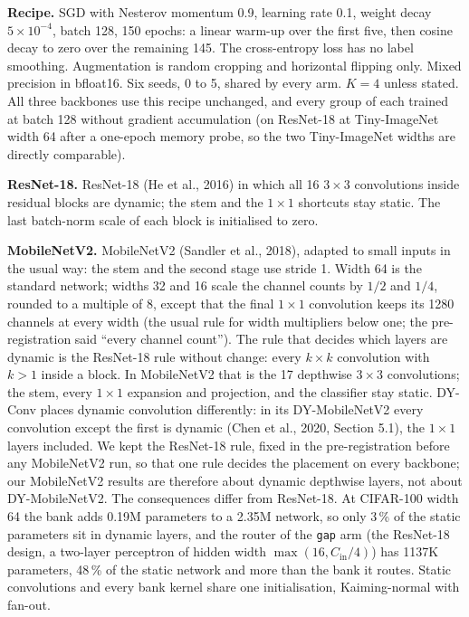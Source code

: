 \documentclass{article}
\begin{document}
\textbf{Recipe.}  SGD with Nesterov momentum 0.9, learning rate 0.1,
weight decay $5\times10^{-4}$, batch 128, 150 epochs: a linear warm-up over
the first five, then cosine decay to zero over the remaining 145. The
cross-entropy loss has no label smoothing. Augmentation is random cropping and horizontal
flipping only. Mixed precision in bfloat16. Six seeds, 0 to 5, shared by
every arm. $K=4$ unless stated. All three backbones use this recipe
unchanged, and every group of each trained at batch 128 without gradient
accumulation (on ResNet-18 at Tiny-ImageNet width 64 after a one-epoch
memory probe, so the two Tiny-ImageNet widths are directly comparable).

\textbf{ResNet-18.}  ResNet-18 (He et al., 2016) in which all 16
$3\times3$ convolutions inside residual blocks are dynamic; the stem and
the $1\times1$ shortcuts stay static. The last batch-norm scale of each
block is initialised to zero.

\textbf{MobileNetV2.}  MobileNetV2 (Sandler et al., 2018),
adapted to small inputs in the usual way: the stem and the second stage
use stride 1. Width 64 is the standard network; widths 32 and 16 scale the
channel counts by $1/2$ and $1/4$, rounded to a multiple of 8, except that
the final $1\times1$ convolution keeps its 1280 channels at every width (the
usual rule for width multipliers below one; the pre-registration said
``every channel count''). The
rule that decides which layers are dynamic is the ResNet-18 rule without
change: every $k\times k$ convolution with $k>1$ inside a block. In
MobileNetV2 that is the 17 depthwise $3\times3$ convolutions; the stem,
every $1\times1$ expansion and projection, and the classifier stay
static. DY-Conv places dynamic convolution differently: in its
DY-MobileNetV2 every convolution except the first is dynamic
(Chen et al., 2020, Section 5.1), the $1\times1$ layers included. We kept
the ResNet-18 rule, fixed in the pre-registration before any MobileNetV2
run, so that one rule decides the placement on every backbone; our
MobileNetV2 results are therefore about dynamic depthwise layers, not about
DY-MobileNetV2. The consequences differ from ResNet-18. At CIFAR-100 width 64 the
bank adds 0.19M parameters to a 2.35M network, so only
3\,\% of the static parameters sit in dynamic layers, and the
router of the \texttt{gap} arm (the ResNet-18 design, a two-layer
perceptron of hidden width $\max(16,C_{\text{in}}/4)$) has 1137K
parameters, 48\,\% of the static network and more than the
bank it routes. Static convolutions and every bank kernel share one
initialisation, Kaiming-normal with fan-out.
\end{document}
